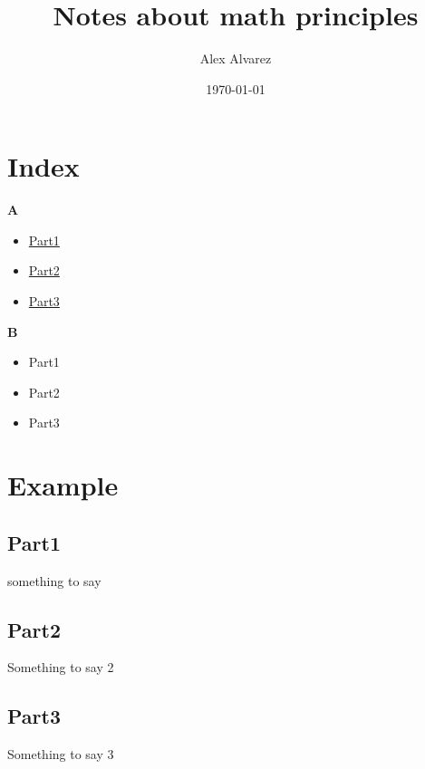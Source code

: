 \documentclass[12pt]{article}
\title{Notes about math principles}
\author{Alex Alvarez}
\date{\today}
\begin{document}
    \maketitle
    \section*{Index}
    \begin{multicols*}{2}
        \raggedright

        \textbf{A}
        \begin{itemize}
            \item \hyperref[Part1]{Part1} 
            \item \hyperref[Part2]{Part2}
            \item \hyperref[Part3]{Part3}
        \end{itemize}

        \textbf{B}
        \begin{itemize}
            \item Part1 
            \item Part2
            \item Part3
        \end{itemize}
    \end{multicols*}


    \section{Example}
    \subsection{Part1}
    \label{Part1}

    something to say

    \subsection{Part2}
    \label{Part2}
    Something to say 2

    \subsection{Part3}
    \label{Part3}
    Something to say 3
\end{document}
